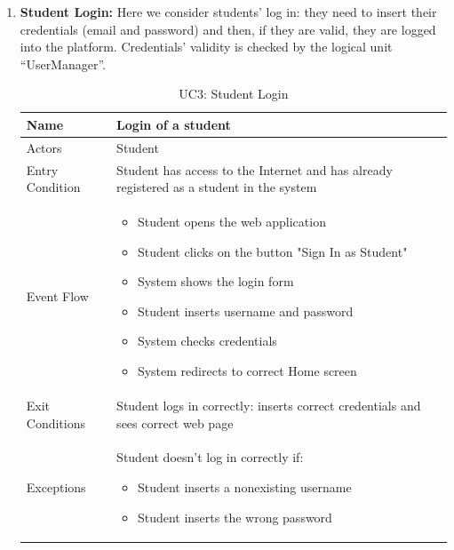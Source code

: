 \begin{enumerate}
   \newpage
   
   \item \textbf{Student Login:}
    Here we consider students' log in: they need to insert their credentials (email and password) and then, if they are valid, they are logged into the platform. Credentials’ validity is checked by the logical unit “UserManager”.

   \begin{table}[H]
       \centering
       \begin{tabular}{|l|m{11cm}|}
        \hline
            Name & Login of a student\\
        \hline
            Actors & Student\\
        \hline
            Entry Condition & Student has access to the Internet and has already registered as a student in the system\\
        \hline
            Event Flow & 
            \begin{itemize}
                \item Student opens the web application
                \item Student clicks on the button "Sign In as Student"
                \item System shows the login form
                \item Student inserts username and password
                \item System checks credentials
                \item System redirects to correct Home screen        
            \end{itemize} \\
        \hline
            Exit Conditions & Student logs in correctly: inserts correct credentials and sees correct web page\\
        \hline
            Exceptions & Student doesn't log in correctly if:
            \begin{itemize}
                \item Student inserts a nonexisting username
                \item Student inserts the wrong password
            \end{itemize} \\
        \hline
       \end{tabular}
       \caption{UC3: Student Login}
       \label{tab:uc3}
   \end{table}
   
   \newpage
   

\end{enumerate}

